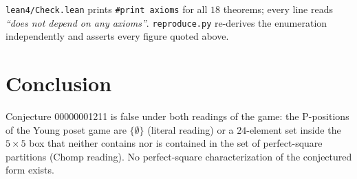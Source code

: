 \documentclass[11pt]{article}
\theoremstyle{definition}
\begin{document}
\texttt{lean4/Check.lean} prints \texttt{\#print axioms} for all $18$ theorems; every line
reads \emph{``does not depend on any axioms''}. \texttt{reproduce.py} re-derives the
enumeration independently and asserts every figure quoted above.

\section*{Conclusion}

Conjecture 00000001211 is false under both readings of the game: the P-positions of the Young
poset game are $\{\emptyset\}$ (literal reading) or a $24$-element set inside the $5\times5$
box that neither contains nor is contained in the set of perfect-square partitions (Chomp
reading). No perfect-square characterization of the conjectured form exists.
\end{document}
